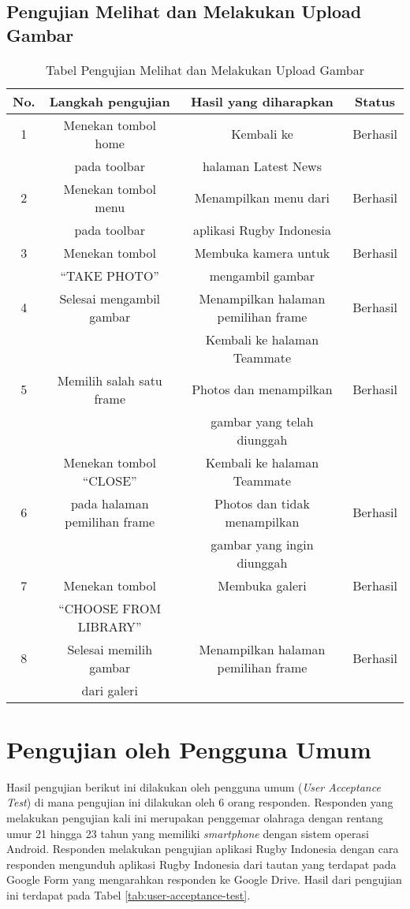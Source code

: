 \subsection{Pengujian Melihat dan Melakukan Upload Gambar}
\begin{table} [H]
    \centering
    \caption{Tabel Pengujian Melihat dan Melakukan Upload Gambar}
    \begin{tabular}{|c|c|c|c|}
    \hline
       No. & Langkah pengujian & Hasil yang diharapkan & Status  \\ \hline
        1 & Menekan tombol home & Kembali ke & Berhasil \\
         & pada toolbar & halaman Latest News &  \\ \hline
     2 & Menekan tombol menu & Menampilkan menu dari & Berhasil \\
     & pada toolbar & aplikasi Rugby Indonesia &  \\ \hline
     3 & Menekan tombol & Membuka kamera untuk & Berhasil \\
     & ``TAKE PHOTO'' & mengambil gambar &  \\ \hline
     4 & Selesai mengambil gambar & Menampilkan halaman pemilihan frame & Berhasil \\ \hline
      &  & Kembali ke halaman Teammate &  \\
    5 & Memilih salah satu frame &  Photos dan menampilkan  & Berhasil \\
     &  &  gambar yang telah diunggah &  \\ \hline
      & Menekan tombol ``CLOSE'' & Kembali ke halaman Teammate  &  \\
   6 & pada halaman pemilihan frame & Photos dan tidak menampilkan  & Berhasil \\
     &  & gambar yang ingin diunggah &  \\ \hline
     7 & Menekan tombol & Membuka galeri & Berhasil \\
     & ``CHOOSE FROM LIBRARY'' &  &  \\ \hline
     8 & Selesai memilih gambar & Menampilkan halaman pemilihan frame & Berhasil \\
     & dari galeri &  &  \\ \hline
    \end{tabular}
    \label{tab:view-and-upload-image-test}
\end{table}

\section{Pengujian oleh Pengguna Umum}
Hasil pengujian berikut ini dilakukan oleh pengguna umum (\textit{User Acceptance Test}) di mana pengujian ini dilakukan oleh 6 orang responden. Responden yang melakukan pengujian kali ini merupakan penggemar olahraga dengan rentang umur 21 hingga 23 tahun yang memiliki \textit{smartphone} dengan sistem operasi Android. Responden melakukan pengujian aplikasi Rugby Indonesia dengan cara responden mengunduh aplikasi Rugby Indonesia dari tautan yang terdapat pada Google Form yang mengarahkan responden ke Google Drive. Hasil dari pengujian ini terdapat pada Tabel \ref{tab:user-acceptance-test}.

